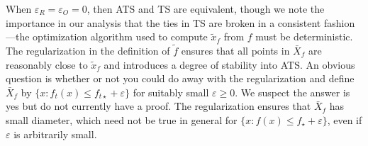 \documentclass[letter, 12pt]{report}
\newcommand{\epsR}{{\epsilon_R}}
\newcommand{\epsO}{{\epsilon_O}}
\newcommand{\1}{\mathbf{1}}
\newcommand{\ts}{\textsc{TS}\xspace}
\newcommand{\ats}{\textsc{ATS}}
\renewcommand{\epsilon}{\varepsilon}
\theoremstyle{plain}
\theoremstyle{definition}
\theoremstyle{remark}
\begin{document}
When $\epsR = \epsO = 0$, then \ats{} and \ts{} are equivalent, though we note the importance in our analysis
that the ties in \ts{} are broken in a consistent fashion---the optimization algorithm used to compute $\tilde x_f$ from $f$ must be deterministic.
The regularization in the definition of $\tilde f$ ensures that all points in $\bar X_f$ are reasonably close to $\tilde x_f$ and introduces
a degree of stability into \ats{}.
An obvious question is whether or not you could do away with the regularization and define $\bar X_f$ by  $\{x : f_t(x) \leq f_{t\star} + \epsilon\}$
for suitably small $\epsilon \geq 0$.
We suspect the answer is yes but do not currently have a proof.
The regularization ensures that $\bar X_f$ has small diameter, which need not be true in general for $\{x : f(x) \leq f_\star + \epsilon\}$,
even if $\epsilon$ is arbitrarily small.
\end{document}
